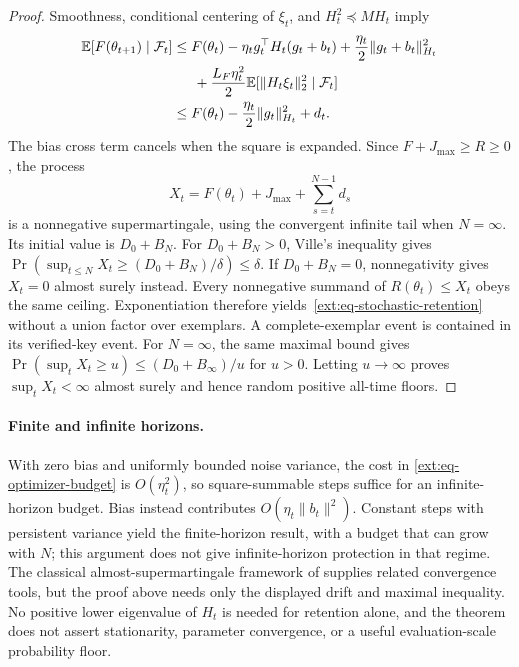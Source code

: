 \begin{proof}
Smoothness, conditional centering of $\xi_t$, and
$H_t^2\preceq MH_t$ imply
\begin{align*}
 \mathbb E[F(\theta_{t+1})\mid\mathcal F_t]
 &\le F(\theta_t)-\eta_tg_t^\top H_t(g_t+b_t)
       +\frac{\eta_t}{2}\|g_t+b_t\|_{H_t}^2\\
 &\hspace{1.5em}+\frac{L_F\eta_t^2}{2}
          \mathbb E[\|H_t\xi_t\|_2^2\mid\mathcal F_t]\\
 &\le F(\theta_t)-\frac{\eta_t}{2}\|g_t\|_{H_t}^2+d_t.
\end{align*}
The bias cross term cancels when the square is expanded. Since
$F+J_{\max}\ge R\ge0$, the process
\[
 X_t=F(\theta_t)+J_{\max}+\sum_{s=t}^{N-1}d_s
\]
is a nonnegative supermartingale, using the convergent infinite tail when
$N=\infty$. Its initial value is $D_0+B_N$. For $D_0+B_N>0$, Ville's
inequality gives
$\Pr(\sup_{t\le N}X_t\ge(D_0+B_N)/\delta)\le\delta$.
If $D_0+B_N=0$, nonnegativity gives $X_t=0$ almost surely instead.
Every nonnegative summand of $R(\theta_t)\le X_t$ obeys the same ceiling.
Exponentiation therefore yields~\eqref{ext:eq-stochastic-retention}
without a union factor over exemplars. A complete-exemplar event is contained
in its verified-key event. For $N=\infty$, the same maximal bound gives
$\Pr(\sup_tX_t\ge u)\le(D_0+B_\infty)/u$ for $u>0$.
Letting $u\to\infty$ proves $\sup_tX_t<\infty$ almost surely and hence
random positive all-time floors.
\end{proof}

\paragraph{Finite and infinite horizons.}
With zero bias and uniformly bounded noise variance, the cost in
\eqref{ext:eq-optimizer-budget} is $O(\eta_t^2)$, so square-summable steps
suffice for an infinite-horizon budget. Bias instead contributes
$O(\eta_t\|b_t\|^2)$. Constant steps with persistent variance yield the
finite-horizon result, with a budget that can grow with $N$; this argument
does not give infinite-horizon protection in that regime. The classical
almost-supermartingale framework of \citet{robbins1971almost} supplies
related convergence tools, but the proof above needs only the displayed
drift and maximal inequality. No positive lower eigenvalue of $H_t$ is
needed for retention alone, and the theorem does not assert stationarity,
parameter convergence, or a useful evaluation-scale probability floor.

